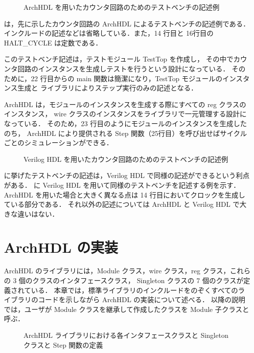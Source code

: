 \begin{figure}[t]
 
 \caption{ArchHDL を用いたカウンタ回路のためのテストベンチの記述例}
 \label{src:test}
\end{figure}

 は，先に示したカウンタ回路の ArchHDL によるテストベンチの記述例である．
インクルードの記述などは省略している．また，14 行目と 16行目の HALT\_CYCLE は定数である．

このテストベンチ記述は，テストモジュール TestTop を作成し，
その中でカウンタ回路のインスタンスを生成しテストを行うという設計になっている．
そのために，22 行目からの main 関数は簡潔になり，TestTop モジュールのインスタンス生成と
ライブラリによりステップ実行のみの記述となる．

ArchHDL は，モジュールのインスタンスを生成する際にすべての reg クラスのインスタンス，
wire クラスのインスタンスをライブラリで一元管理する設計になっている．
そのため，23 行目のようにモジュールのインスタンスを生成したのち，
ArchHDL により提供される Step 関数（25行目）を呼び出せばサイクルごとのシミュレーションができる．

\begin{figure}[t]
 
 \caption{Verilog HDL を用いたカウンタ回路のためのテストベンチの記述例}
 \label{src:test_v}
\end{figure}

 に挙げたテストベンチの記述は，Verilog HDL で同様の記述ができるという利点がある．
 に Verilog HDL を用いて同様のテストベンチを記述する例を示す．
ArchHDL を用いた場合と大きく異なる点は 14 行目においてクロックを生成している部分である．
それ以外の記述については ArchHDL と Verilog HDL で大きな違いはない．

\fi

\section{ArchHDL の実装} \label{ss:implementation}

ArchHDL のライブラリには，Module クラス，wire クラス，reg クラス，これらの 3 個のクラスのインタフェースクラス，
Singleton クラスの 7 個のクラスが定義されている．
本章では，標準ライブラリのインクルードをのぞくすべてのライブラリのコードを示しながら ArchHDL の実装について述べる．
以降の説明では，ユーザが Module クラスを継承して作成したクラスを Module 子クラスと呼ぶ．

\begin{figure}[p]
  
 \caption{ArchHDL ライブラリにおける各インタフェースクラスと Singleton クラスと Step 関数の定義}
 \label{src:class_singleton}
\end{figure}

